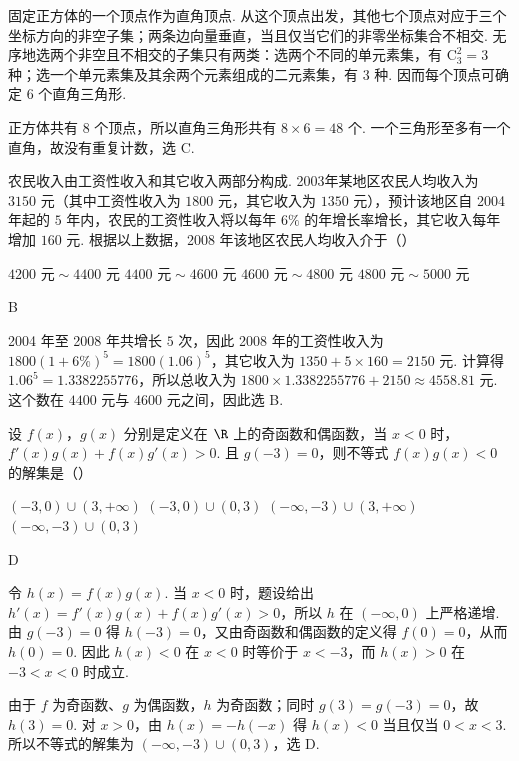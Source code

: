 \begin{solution}
固定正方体的一个顶点作为直角顶点. 从这个顶点出发，其他七个顶点对应于三个坐标方向的非空子集；两条边向量垂直，当且仅当它们的非零坐标集合不相交. 无序地选两个非空且不相交的子集只有两类：选两个不同的单元素集，有 \(\mathrm C_3^2=3\) 种；选一个单元素集及其余两个元素组成的二元素集，有 \(3\) 种. 因而每个顶点可确定 \(6\) 个直角三角形.

正方体共有 \(8\) 个顶点，所以直角三角形共有 \(8\times6=48\) 个. 一个三角形至多有一个直角，故没有重复计数，选 C.
\end{solution}

\begin{problem}
农民收入由工资性收入和其它收入两部分构成. 2003年某地区农民人均收入为 \(3150\text{ 元}\)（其中工资性收入为 \(1800\text{ 元}\)，其它收入为 \(1350\text{ 元}\)），预计该地区自 2004 年起的 \(5\text{ 年}\)内，农民的工资性收入将以每年 \(6\%\) 的年增长率增长，其它收入每年增加 \(160\text{ 元}\). 根据以上数据，2008 年该地区农民人均收入介于（\quad）

\choices
    {\(4200\text{ 元}\sim 4400\text{ 元}\)}
    {\(4400\text{ 元}\sim 4600\text{ 元}\)}
    {\(4600\text{ 元}\sim 4800\text{ 元}\)}
    {\(4800\text{ 元}\sim 5000\text{ 元}\)}
\end{problem}

\begin{answer}
B
\end{answer}

\begin{solution}
2004 年至 2008 年共增长 \(5\) 次，因此 2008 年的工资性收入为 \(1800(1+6\%)^5=1800(1.06)^5\)，其它收入为 \(1350+5\times160=2150\) 元. 计算得 \(1.06^5=1.3382255776\)，所以总收入为 \(1800\times1.3382255776+2150\approx4558.81\) 元. 这个数在 \(4400\) 元与 \(4600\) 元之间，因此选 B.
\end{solution}

\begin{problem}
设 \(f(x)\)，\(g(x)\) 分别是定义在 \(\R\) 上的奇函数和偶函数，当 \(x<0\) 时，\(f'(x)g(x)+f(x)g'(x)>0\). 且 \(g(-3)=0\)，则不等式 \(f(x)g(x)<0\) 的解集是（\quad）

\choices
    {\((-3,0)\cup(3,+\infty)\)}
    {\((-3,0)\cup(0,3)\)}
    {\((-\infty,-3)\cup(3,+\infty)\)}
    {\((-\infty,-3)\cup(0,3)\)}
\end{problem}

\begin{answer}
D
\end{answer}

\begin{solution}
令 \(h(x)=f(x)g(x)\). 当 \(x<0\) 时，题设给出 \(h'(x)=f'(x)g(x)+f(x)g'(x)>0\)，所以 \(h\) 在 \((-\infty,0)\) 上严格递增. 由 \(g(-3)=0\) 得 \(h(-3)=0\)，又由奇函数和偶函数的定义得 \(f(0)=0\)，从而 \(h(0)=0\). 因此 \(h(x)<0\) 在 \(x<0\) 时等价于 \(x<-3\)，而 \(h(x)>0\) 在 \(-3<x<0\) 时成立.

由于 \(f\) 为奇函数、\(g\) 为偶函数，\(h\) 为奇函数；同时 \(g(3)=g(-3)=0\)，故 \(h(3)=0\). 对 \(x>0\)，由 \(h(x)=-h(-x)\) 得 \(h(x)<0\) 当且仅当 \(0<x<3\). 所以不等式的解集为 \((-\infty,-3)\cup(0,3)\)，选 D.
\end{solution}

